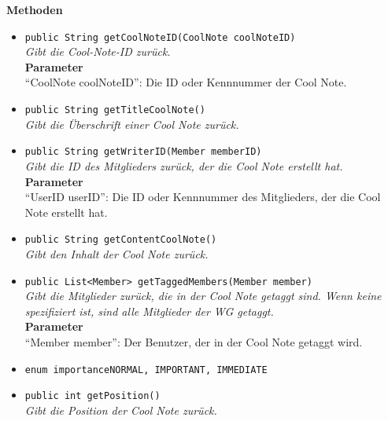 	\textbf{Methoden}
	\begin{itemize}
		\item\texttt{{public String getCoolNoteID(CoolNote coolNoteID)}}\\
		\textit{Gibt die Cool-Note-ID zurück.}\\
		\textbf{Parameter}\\
		“CoolNote coolNoteID”: Die ID oder Kennnummer der Cool Note.\\
		\item\texttt{{public String getTitleCoolNote()}}\\
		\textit{Gibt die Überschrift einer Cool Note zurück.}\\
		\item\texttt{{public String getWriterID(Member memberID)}}\\
		\textit{Gibt die ID des Mitglieders zurück, der die Cool Note erstellt hat.}\\
		\textbf{Parameter}\\
		“UserID userID”: Die ID oder Kennnummer des Mitglieders, der die Cool Note erstellt hat.\\
		
		\item\texttt{{public String getContentCoolNote()}}\\
		\textit{Gibt den Inhalt der Cool Note zurück.}\\
		\item\texttt{{public List<Member> getTaggedMembers(Member member)}}\\
		\textit{Gibt die Mitglieder zurück, die in der Cool Note getaggt sind. Wenn keine spezifiziert ist, sind alle Mitglieder der WG getaggt.}\\
		\textbf{Parameter}\\
		“Member member”: Der Benutzer, der in der Cool Note getaggt wird.\\
		\item\texttt{{enum importance{NORMAL, IMPORTANT, IMMEDIATE}}}\\
		\item\texttt{{public int getPosition()}}\\
		\textit{Gibt die Position der Cool Note zurück.}\\
	\end{itemize}

